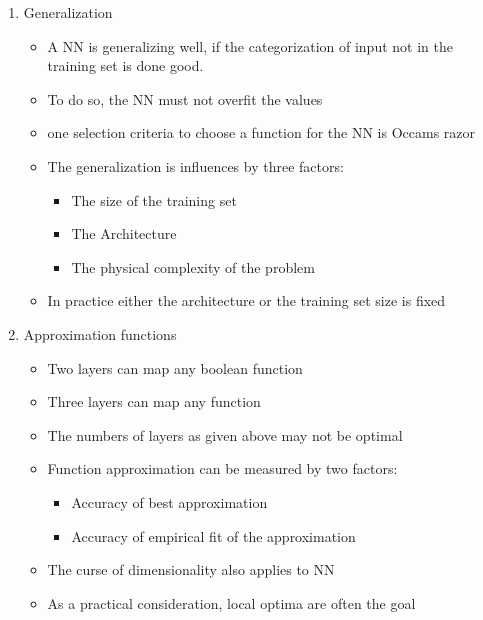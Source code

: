 \documentclass{scrartcl}
\begin{document}
\begin{enumerate}
\addtocounter{enumi}{3}
\item Generalization
	\begin{itemize}
	\item A NN is generalizing well, if the categorization of input not in the training set is done good. 
	\item To do so, the NN must not overfit the values
	\item one selection criteria to choose a function for the NN is Occams razor
	\item The generalization is influences by three factors:
		\begin{itemize}
		\item The size of the training set
		\item The Architecture
		\item The physical complexity of the problem
		\end{itemize}
	\item In practice either the architecture or the training set size is fixed
	\end{itemize}
	
\item Approximation functions
	\begin{itemize}
	\item Two layers can map any boolean function
	\item Three layers can map any function
	\item The numbers of layers as given above may not be optimal
	\item Function approximation can be measured by two factors:
		\begin{itemize}
		\item Accuracy of best approximation
		\item Accuracy of empirical fit of the approximation
		\end{itemize}
	\item The curse of dimensionality also applies to NN
	\item As a practical consideration, local optima are often the goal
	\end{itemize}
	

\end{enumerate}
\end{document}
